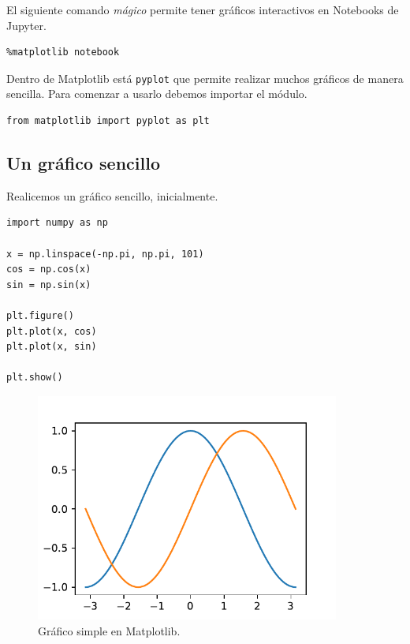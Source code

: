 El siguiente comando \emph{mágico} permite tener gráficos interactivos
en Notebooks de Jupyter.

\begin{listing}[H]
\begin{verbatim}
%matplotlib notebook
\end{verbatim}
\end{listing}

Dentro de Matplotlib está \texttt{pyplot} que permite realizar muchos
gráficos de manera sencilla. Para comenzar a usarlo debemos importar el
módulo.

\begin{listing}[H]
\begin{verbatim}
from matplotlib import pyplot as plt
\end{verbatim}
\end{listing}

\subsection{Un gráfico sencillo}

Realicemos un gráfico sencillo, inicialmente.

\begin{listing}[H]
\begin{verbatim}
import numpy as np

x = np.linspace(-np.pi, np.pi, 101)
cos = np.cos(x)
sin = np.sin(x)

plt.figure()
plt.plot(x, cos)
plt.plot(x, sin)

plt.show()
\end{verbatim}
\end{listing}

\begin{figure}[H]
	\centering
	\includegraphics[width=10cm]{img/herramientas/grafico_sencillo}
	\caption{Gráfico simple en Matplotlib.}
	\label{fig:graficosencillo}
\end{figure}

